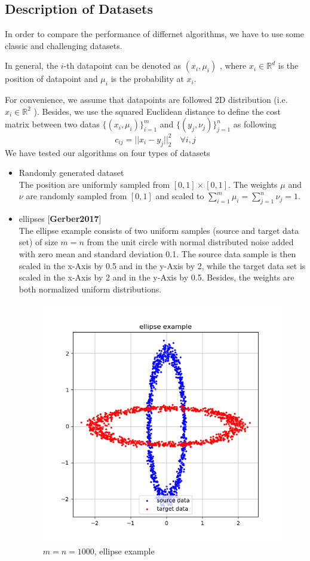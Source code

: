 \documentclass{article}
\begin{document}
\begin{large}
\subsection{Description of Datasets}
In order to compare the performance of differnet algorithms, we have to use some classic and challenging datasets.

In general, the $i$-th datapoint can be denoted as $(x_{i},\mu_{i})$ , where $x_{i}\in \mathbb{R}^{d}$ is the position of datapoint and $\mu_{i}$ is the probability at $x_{i}$.

For convenience, we assume that datapoints are followed 2D distribution (i.e. $x_{i}\in \mathbb{R}^{2}$ ). Besides, we use the squared Euclidean distance to define the cost matrix between two datas $\{(x_{i},\mu_{i})\}_{i=1}^{m}$ and $\{(y_{j},\nu_{j})\}_{j=1}^{n}$ as following
\begin{equation}
  c_{ij}=||x_{i}-y_{j}||_{2}^{2}\quad\forall i, j
\end{equation}
We have tested our algorithms on four types of datasets
\begin{itemize}
  \item Randomly generated dataset\\
        The position are uniformly sampled from
        $[0, 1]\times[0, 1]$. The weights $\mu$ and $\nu$ are randomly sampled from $[0, 1]$ and scaled to $ \sum_{i=1}^{m}{\mu_i} = \sum_{j=1}^{n}{\nu_j} = 1 $.
  \item ellipses [\textbf{Gerber2017}]\\
  The ellipse example consists of two uniform samples (source and target data set) of size $m=n$ from the unit circle
  with normal distributed noise added with zero mean and standard deviation 0.1. The source
  data sample is then scaled in the x-Axis by 0.5 and in the y-Axis by 2, while the target
  data set is scaled in the x-Axis by 2 and in the y-Axis by 0.5.
  Besides, the weights are both normalized uniform distributions.
  \begin{figure}[H]
  \centering
  \includegraphics[width=.5\textwidth]{ellip.png}
  \captionsetup{justification=centering}
  \caption{\label{fig:ellip}$m=n=1000$, ellipse example}
\end{figure}


\end{itemize}
\end{large}
\end{document}
